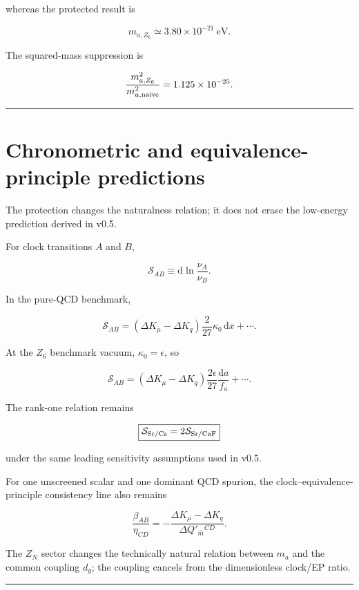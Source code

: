 \documentclass[11pt,a4paper]{article}
\begin{document}
whereas the protected result is

\[
m_{a,Z_6}\simeq3.80\times10^{-21}\ \mathrm{eV}.
\]

The squared-mass suppression is

\[
\frac{m_{a,Z_6}^2}{m_{a,\rm naive}^2}
=1.125\times10^{-25}.
\]

\begin{center}\rule{0.5\linewidth}{0.5pt}\end{center}

\section{Chronometric and equivalence-principle
predictions}\label{chronometric-and-equivalence-principle-predictions}

The protection changes the naturalness relation; it does not erase the
low-energy prediction derived in v0.5.

For clock transitions \(A\) and \(B\),

\[
\mathcal S_{AB}
\equiv
\mathrm d\ln\frac{\nu_A}{\nu_B}.
\]

In the pure-QCD benchmark,

\[
\boxed{
\mathcal S_{AB}
=
(\Delta K_\mu-\Delta K_q)
\frac{2}{27}\kappa_0\,\mathrm dx
+\cdots.
}
\]

At the \(Z_6\) benchmark vacuum, \(\kappa_0=\epsilon\), so

\[
\boxed{
\mathcal S_{AB}
=
(\Delta K_\mu-\Delta K_q)
\frac{2\epsilon}{27}\frac{\mathrm da}{f_a}
+\cdots.
}
\]

The rank-one relation remains

\[
\boxed{
\mathcal S_{\rm Sr/Cs}
=2\mathcal S_{\rm Sr/CaF}
}
\]

under the same leading sensitivity assumptions used in v0.5.

For one unscreened scalar and one dominant QCD spurion, the
clock--equivalence-principle consistency line also remains

\[
\boxed{
\frac{\beta_{AB}}{\eta_{CD}}
=-
\frac{\Delta K_\mu-\Delta K_q}
{\Delta Q'_{\widehat m}{}^{CD}}.
}
\]

The \(Z_N\) sector changes the technically natural relation between
\(m_a\) and the common coupling \(d_g\); the coupling cancels from the
dimensionless clock/EP ratio.

\begin{center}\rule{0.5\linewidth}{0.5pt}\end{center}
\end{document}
